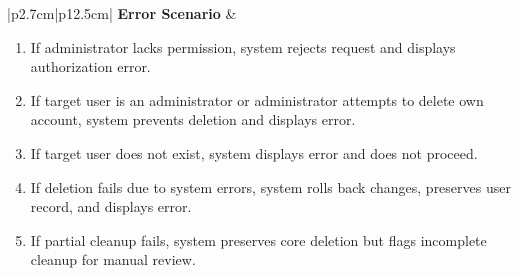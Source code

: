 \begin{table}[H]
\begin{tabular}{|p{2.7cm}|p{12.5cm}|}
        \textbf{Error Scenario} & \begin{minipage}[t]{\linewidth}
                                      \begin{enumerate}[topsep=0pt,itemsep=1pt,parsep=0pt,partopsep=0pt]
                                          \item If administrator lacks permission, system rejects request and displays authorization error.
                                          \item If target user is an administrator or administrator attempts to delete own account, system prevents deletion and displays error.
                                          \item If target user does not exist, system displays error and does not proceed.
                                          \item If deletion fails due to system errors, system rolls back changes, preserves user record, and displays error.
                                          \item If partial cleanup fails, system preserves core deletion but flags incomplete cleanup for manual review.
                                      \end{enumerate}
                                  \end{minipage} \\\hline
    \end{tabular}
    \label{tab:admin-delete-user}
\end{table}





